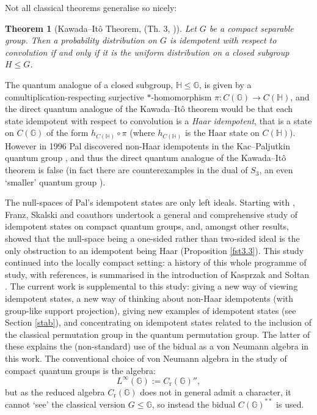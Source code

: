 \documentclass[12pt]{amsart}
\newtheorem{theorem}{Theorem}[section]
\theoremstyle{remark}
\theoremstyle{remark}
\begin{document}
Not all classical theorems generalise so nicely:
\begin{theorem}[Kawada--It\^{o} Theorem, (Th. 3, \cite{kaw})]\label{kawito}
Let $G$ be a compact separable group. Then a probability distribution on $G$ is idempotent with respect to convolution if and only if it is the uniform distribution on a closed subgroup $H\leq G$.
\end{theorem}
The quantum analogue of a closed subgroup, $\mathbb{H}\leq \mathbb{G}$, is given by a comultiplication-respecting surjective $\ast$-homomorphism $\pi:C(\mathbb{G})\to C(\mathbb{H})$, and  the direct quantum analogue of the Kawada--It\^{o} theorem would be that each state idempotent with respect to convolution is a \emph{Haar idempotent}, that is a state on $C(\mathbb{G})$ of the form $h_{C(\mathbb{H})}\circ \pi$ (where  $h_{C(\mathbb{H})}$  is the Haar state on $C(\mathbb{H})$). However in 1996 Pal discovered non-Haar idempotents in the Kac--Paljutkin quantum group \cite{pal}, and thus the direct quantum analogue of the Kawada--It\^{o} theorem is false (in fact there are counterexamples in the dual of $S_3$, an even `smaller' quantum group \cite{frs}).

\bigskip

The null-spaces of Pal's idempotent states are only left ideals. Starting with \cite{frs},  Franz, Skalski and coauthors  undertook a general and comprehensive study of idempotent states on compact quantum groups, and, amongst other results, showed that the null-space being a one-sided rather than two-sided ideal is the only obstruction to an idempotent being Haar (Proposition \ref{fst3.3}). This study continued into the locally compact setting: a history of this whole programme of study, with references, is summarised in the introduction of Kasprzak and So{\l}tan \cite{kap}. The current work is supplemental to this study: giving a new way of viewing idempotent states, a new way of thinking about non-Haar idempotents (with group-like support projection), giving new examples of idempotent states (see Section \ref{stab}), and concentrating on idempotent states related to the inclusion of the classical permutation group in the quantum permutation group. The latter of these explains the (non-standard) use of the bidual as a von Neumann algebra in this work. The conventional choice of von Neumann algebra in the study of compact quantum groups is the algebra:
$$L^\infty(\mathbb{G}):=C_{\text{r}}(\mathbb{G})'',$$
but as the reduced algebra $C_{\text{r}}(\mathbb{G})$ does not in general admit a character, it cannot `see' the classical version $G\leq \mathbb{G}$, so instead  the bidual $C(\mathbb{G})^{**}$ is used.
\end{document}
